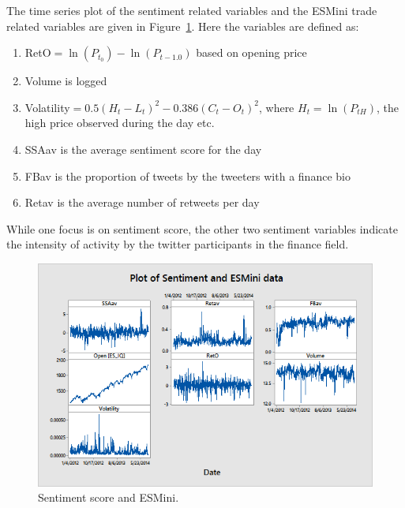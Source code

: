 The time series plot of the sentiment related variables and the ESMini trade related variables are given in Figure~\ref{fig:sentimentesmini}. Here the variables are defined as:
\begin{enumerate}[--]
\item RetO$=\ln(P_{t_0}) - \ln(P_{t-1.0})$ based on opening price
\item Volume is logged
\item Volatility$= 0.5(H_t-L_t)^2 - 0.386(C_t-O_t)^2$, where $H_t=\ln(P_{tH})$, the high price observed during the day etc.
\item SSAav is the average sentiment score for the day
\item FBav is the proportion of tweets by the tweeters with a finance bio
\item Retav is the average number of retweets per day 
\end{enumerate}
While one focus is on sentiment score, the other two sentiment variables indicate the intensity of activity by the twitter participants in the finance field. 

	\begin{figure}[!ht]
	\centering
	\includegraphics[width=\textwidth]{chapters/chapter_news_an/figures/ch4sec4sentimentesmini} 
	\caption{Sentiment score and ESMini. \label{fig:sentimentesmini}}
	\end{figure}

